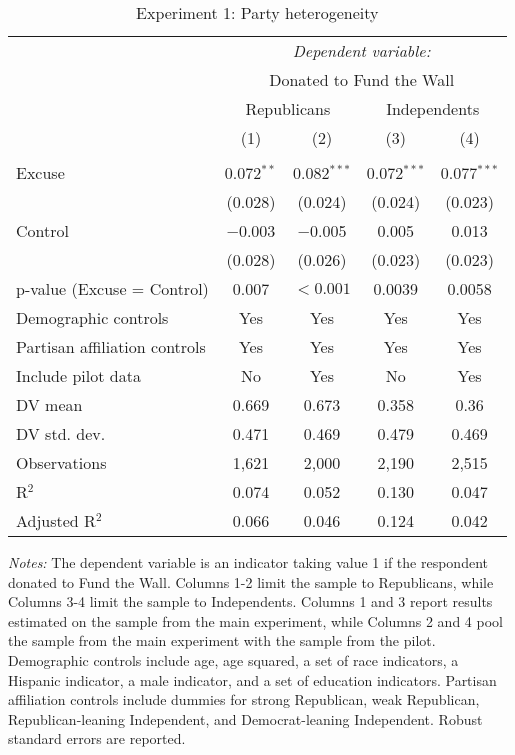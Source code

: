 
\begin{table}[!htbp] \centering 
  \caption{Experiment 1: Party heterogeneity} 
  \label{t:2-partyheterogeneity} 
\begin{threeparttable}
\begin{tabular}{@{\hspace{5pt}}l@{\hspace{5pt}}cccc} 
\toprule 
 & \multicolumn{4}{c}{\textit{Dependent variable:}} \\ 
\cmidrule(rr){2-5} 
 & \multicolumn{4}{c}{Donated to Fund the Wall} \\ 
 \cmidrule(rr){2-5}
 & \multicolumn{2}{c}{Republicans} & \multicolumn{2}{c}{Independents} \\ 
 & (1) & (2) & (3) & (4)\\ 
\midrule  
\\[-2.1ex] Excuse & 0.072$^{**}$ & 0.082$^{***}$ & 0.072$^{***}$ & 0.077$^{***}$ \\ 
  & (0.028) & (0.024) & (0.024) & (0.023) \\ 
 \addlinespace 
 Control & $-$0.003 & $-$0.005 & 0.005 & 0.013 \\ 
  & (0.028) & (0.026) & (0.023) & (0.023) \\ 
 \addlinespace 
p-value (Excuse = Control) & 0.007 & $<0.001$ & 0.0039 & 0.0058 \\ 
\midrule  
Demographic controls & Yes & Yes & Yes & Yes \\ 
Partisan affiliation controls & Yes & Yes & Yes & Yes \\ 
\midrule
Include pilot data & No & Yes & No & Yes \\
\addlinespace
DV mean & 0.669 & 0.673 & 0.358 & 0.36 \\
DV std. dev. & 0.471 & 0.469 & 0.479 & 0.469 \\
Observations & 1,621 & 2,000 & 2,190 & 2,515 \\ 
R$^{2}$ & 0.074 & 0.052 & 0.130 & 0.047 \\ 
Adjusted R$^{2}$ & 0.066 & 0.046 & 0.124 & 0.042 \\ 
\bottomrule 
\end{tabular} 
\begin{tablenotes}
\footnotesize
\item \textit{Notes:} The dependent variable is an indicator taking value 1 if the respondent donated to Fund the Wall. Columns 1-2 limit the sample to Republicans, while Columns 3-4 limit the sample to Independents. Columns 1 and 3 report results estimated on the sample from the main experiment, while Columns 2 and 4 pool the sample from the main experiment with the sample from the pilot. Demographic controls include age, age squared, a set of race indicators, a Hispanic indicator, a male indicator, and a set of education indicators. Partisan affiliation controls include dummies for strong Republican, weak Republican, Republican-leaning Independent, and Democrat-leaning Independent. Robust standard errors are reported.
\end{tablenotes}
\end{threeparttable}
\end{table} 
